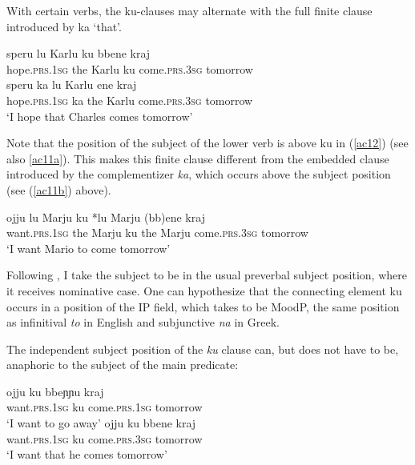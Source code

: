 \documentclass[output=paper]{langscibook}
\begin{document}
With certain verbs, the ku-clauses may alternate with the full finite clause introduced by ka ‘that’. 

\ea\label{ac11}
    \ea \label{ac11a}\gll speru   lu  Karlu   ku  bbene      kraj \\
       hope.\textsc{prs}.\textsc{1sg}    the  Karlu   ku  come.\textsc{prs}.\textsc{3sg}  tomorrow\\
    \ex \label{ac11b}\gll speru       ka   lu  Karlu ene       kraj \\
     hope.\textsc{prs}.\textsc{1sg}    ka   the  Karlu  come.\textsc{prs}.\textsc{3sg}  tomorrow\\
   \glt ‘I hope that Charles comes tomorrow’
    \z
\z

Note that the position of the subject of the lower verb is above ku in (\ref{ac12}) (see also \ref{ac11a}). This makes this finite clause different from the embedded clause introduced by the complementizer \textit{ka}, which occurs above the subject position (see (\ref{ac11b}) above). 

\ea\label{ac12}
\gll ojju   {lu Marju} ku {*lu Marju} (bb)ene  kraj \\
 want.\textsc{prs}.\textsc{1sg} {the Marju} ku {the Marju}  come.\textsc{prs}.\textsc{3sg} tomorrow\\
\glt ‘I want Mario to come tomorrow’
\z

Following \citet[36]{calabrese1993a}, I take the subject to be in the usual preverbal subject position, where it receives nominative case.  One can hypothesize that the connecting element ku occurs in a position of the IP field, which \citet{roberts2003a} takes to be MoodP, the same position as infinitival \textit{to} in English and subjunctive \textit{na} in Greek.

The independent subject position of the \textit{ku} clause can, but does not have to be, anaphoric to the subject of the main predicate:

\ea \label{ac13}
    \ea \label{ac13a}
        \gll ojju          ku   bbeɲɲu      kraj\\
   want.\textsc{prs}.\textsc{1sg}   ku    come.\textsc{prs}.\textsc{1sg}  tomorrow\\
    \glt   ‘I want to go away’
    \ex \label{ac13b}
        \gll ojju          ku   bbene       kraj \\
   want.\textsc{prs}.\textsc{1sg}   ku   come.\textsc{prs}.\textsc{3sg}  tomorrow\\
    \glt ‘I want that he comes tomorrow’
    \z
\z
\end{document}
